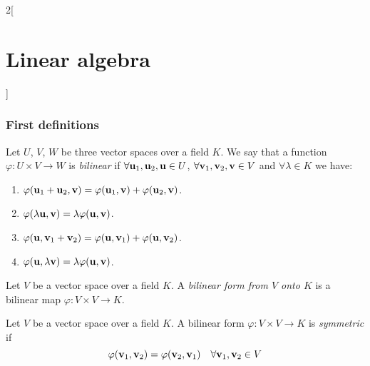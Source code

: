 \documentclass[../../../main.tex]{subfiles}
\begin{document}
\begin{multicols}{2}[\section{Linear algebra}]
  \subsubsection*{First definitions}
  \begin{definition}
    Let $U$, $V$, $W$ be three vector spaces over a field $K$. We say that a function $\varphi:U\times V\rightarrow W$ is \textit{bilinear} if $\forall\vb{u}_1,\vb{u}_2,\vb{u}\in U$, $\forall \vb{v}_1,\vb{v}_2,\vb{v}\in V$ and $\forall\lambda\in K$ we have:
    \begin{enumerate}
      \item $\varphi(\vb{u}_1+\vb{u}_2,\vb{v})=\varphi(\vb{u}_1,\vb{v})+\varphi(\vb{u}_2,\vb{v})$.
      \item $\varphi(\lambda \vb{u},\vb{v})=\lambda \varphi(\vb{u},\vb{v})$.
      \item $\varphi(\vb{u},\vb{v}_1+\vb{v}_2)=\varphi(\vb{u},\vb{v}_1)+\varphi(\vb{u},\vb{v}_2)$.
      \item $\varphi(\vb{u},\lambda \vb{v})=\lambda \varphi(\vb{u},\vb{v})$.
    \end{enumerate}
  \end{definition}
  \begin{definition}
    Let $V$ be a vector space over a field $K$. A \textit{bilinear form from $V$ onto $K$} is a bilinear map $\varphi:V\times V\rightarrow K$.
  \end{definition}
  \begin{definition}
    Let $V$ be a vector space over a field $K$. A bilinear form $\varphi:V\times V\rightarrow K$ is \textit{symmetric} if $$\varphi(\vb{v}_1,\vb{v}_2)=\varphi(\vb{v}_2,\vb{v}_1)\quad\forall \vb{v}_1,\vb{v}_2\in V$$
  \end{definition}

\end{multicols}
\end{document}
